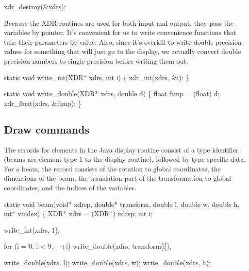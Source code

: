 \nwenddocs{}\endmoddef
xdr_destroy(&xdrs);
\nwendcode{}\nwdocspar

Because the XDR routines are used for both input and output,
they pass the variables by pointer.  It's convenient for us
to write convenience functions that take their parameters
by value.  Also, since it's overkill to write double precision
values for something that will just go to the display, we
actually convert double precision numbers to single precision
before writing them out.

\nwenddocs{}\endmoddef
static void write_int(XDR* xdrs, int i)
\{
    xdr_int(xdrs, &i);
\}

static void write_double(XDR* xdrs, double d)
\{
    float ftmp = (float) d;
    xdr_float(xdrs, &ftmp);
\}

\nwendcode{}\nwdocspar


\subsection{Draw commands}

The records for elements in the Java display routine consist
of a type identifier (beams are element type 1 to the display
routine), followed by type-specific data.  For a beam, the
record consists of the rotation to global coordinates,
the dimensions of the beam, the translation part of the transformation
to global coordinates, and the indices of the variables.

\nwenddocs{}\endmoddef
static void beam(void* xdrsp, double* transform, double l, double w, double h,
                 int* vindex)
\{
    XDR*  xdrs = (XDR*) xdrsp;
    int   i;

    write_int(xdrs, 1);

    for (i = 0; i < 9; ++i)
        write_double(xdrs, transform[i]);

    write_double(xdrs, l);
    write_double(xdrs, w);
    write_double(xdrs, h);

